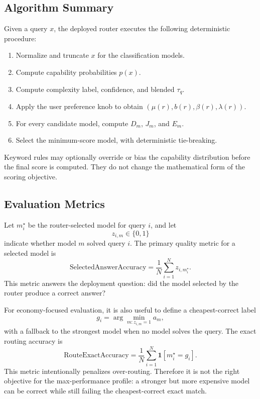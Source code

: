\subsection{Algorithm Summary}
\label{sec:brick-algorithm-summary}

Given a query \(x\), the deployed router executes the following deterministic
procedure:
\begin{enumerate}
  \item Normalize and truncate \(x\) for the classification models.
  \item Compute capability probabilities \(p(x)\).
  \item Compute complexity label, confidence, and blended \(\tau_q\).
  \item Apply the user preference knob to obtain
  \((\mu(r),b(r),\beta(r),\lambda(r))\).
  \item For every candidate model, compute \(D_m\), \(J_m\), and \(E_m\).
  \item Select the minimum-score model, with deterministic tie-breaking.
\end{enumerate}

Keyword rules may optionally override or bias the capability distribution
before the final score is computed. They do not change the mathematical form of
the scoring objective.

\subsection{Evaluation Metrics}
\label{sec:brick-metrics}

Let \(m_i^\star\) be the router-selected model for query \(i\), and let
\[
  z_{i,m}\in\{0,1\}
\]
indicate whether model \(m\) solved query \(i\). The primary quality metric for
a selected model is
\[
  \mathrm{SelectedAnswerAccuracy}
  =
  \frac{1}{N}\sum_{i=1}^{N} z_{i,m_i^\star}.
\]
This metric answers the deployment question: did the model selected by the
router produce a correct answer?

For economy-focused evaluation, it is also useful to define a cheapest-correct
label
\[
  g_i=\arg\min_{m:z_{i,m}=1} a_m,
\]
with a fallback to the strongest model when no model solves the query. The
exact routing accuracy is
\[
  \mathrm{RouteExactAccuracy}
  =
  \frac{1}{N}\sum_{i=1}^{N} \mathbf{1}[m_i^\star=g_i].
\]
This metric intentionally penalizes over-routing. Therefore it is not the right
objective for the max-performance profile: a stronger but more expensive model
can be correct while still failing the cheapest-correct exact match.

